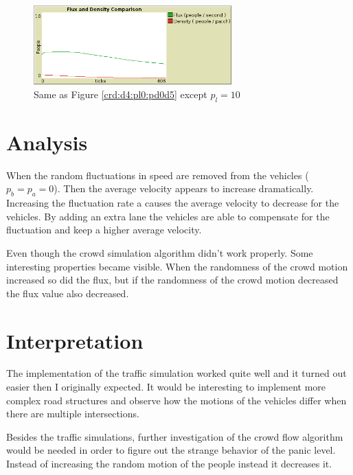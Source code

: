 \documentclass{article}%
\begin{document}
    \begin{figure}[ht!]
        \centering
        \includegraphics[width=3in]{../img/Crowd34x544d_pl10pd0d5.png}
        \caption{Same as Figure \ref{crd:d4:pl0:pd0d5} except $p_l = 10$}
        \label{crd:d4:pl10:pd0d5}
    \end{figure}
    
    \section{ Analysis }

    When the random fluctuations in speed are removed from the vehicles ($p_b = p_a = 0$). Then the average velocity appears to increase dramatically. Increasing the fluctuation rate a causes the average velocity to decrease for the vehicles. By adding an extra lane the vehicles are able to compensate for the fluctuation and keep a higher average velocity. 

    Even though the crowd simulation algorithm didn't work properly. Some interesting properties became visible. When the randomness of the crowd motion increased so did the flux, but if the randomness of the crowd motion decreased the flux value also decreased.    

    \section{ Interpretation }

    The implementation of the traffic simulation worked quite well and it turned out easier then I originally expected. It would be interesting to implement more complex road structures and observe how the motions of the vehicles differ when there are multiple intersections. 

    Besides the traffic simulations, further investigation of the crowd flow algorithm would be needed in order to figure out the strange behavior of the panic level. Instead of increasing the random motion of the people instead it decreases it. 

    \nocite{*}
    
    
\end{document}
